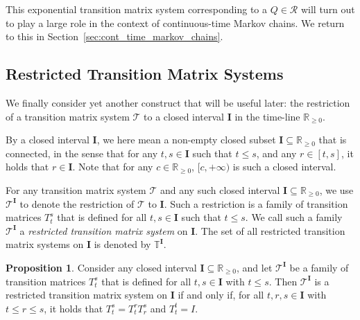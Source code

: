 \documentclass[10pt,a4paper]{paper}
\theoremstyle{definition}
\newtheorem{proposition}[theorem]{Proposition}
\newcommand{\reals}{\mathbb{R}}
\newcommand{\realsnonneg}{\reals_{\geq 0}}
\newcommand{\coloneqq}{:\!=}
\begin{document}
This exponential transition matrix system corresponding to a $Q\in\mathcal{R}$ will turn out to play a large role in the context of continuous-time Markov chains. We return to this in Section~\ref{sec:cont_time_markov_chains}.

\subsection{Restricted Transition Matrix Systems}

We finally consider yet another construct that will be useful later: the restriction of a transition matrix system $\mathcal{T}$ to a closed interval $\mathbf{I}$ in the time-line $\realsnonneg$.

By a closed interval $\mathbf{I}$, we here mean a non-empty closed subset $\mathbf{I}\subseteq\realsnonneg$ that is connected, in the sense that for any $t,s\in\mathbf{I}$ such that $t\leq s$, and any $r\in[t,s]$, it holds that $r\in\mathbf{I}$. Note that for any $c\in\realsnonneg$, $[c,+\infty)$ is such a closed interval.

For any transition matrix system $\mathcal{T}$ and any such closed interval $\mathbf{I}\subseteq\realsnonneg$, we use $\mathcal{T}^\mathbf{I}$ to denote the restriction of $\mathcal{T}$ to $\mathbf{I}$. Such a restriction is a family of transition matrices $T_t^s$ that is defined for all $t,s\in\mathbf{I}$ such that $t\leq s$.
We call such a family $\mathcal{T}^{\mathbf{I}}$ a \emph{restricted transition matrix system} on $\mathbf{I}$. The set of all restricted transition matrix systems on $\mathbf{I}$ is denoted by $\mathbb{T}^{\mathbf{I}}$.


\begin{proposition}\label{prop:restr_trans_mat_system_if_semigroup}
Consider any closed interval $\mathbf{I}\subseteq\realsnonneg$, and let $\mathcal{T}^{\mathbf{I}}$ be a family of transition matrices $T_t^s$ that is defined for all $t,s\in\mathbf{I}$ with $t\leq s$. Then $\mathcal{T}^{\mathbf{I}}$ is a restricted transition matrix system on $\mathbf{I}$ if and only if, for all $t,r,s\in\mathbf{I}$ with $t\leq r\leq s$, it holds that $T_t^s = T_t^rT_r^s$ and $T_t^t=I$.
\end{proposition}
\end{document}
